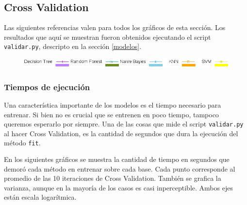 \documentclass[10pt, a4paper]{article}
\begin{document}
\subsection{Cross Validation}

Las siguientes referencias valen para todos los gráficos de esta sección. Los resultados que aquí se muestran fueron obtenidos ejecutando el script \texttt{validar.py}, descripto en la sección \ref{modelos}.

\begin{figure}[H]
\centering
\includegraphics[scale=0.6]{../src/data/refs.png}
\end{figure}

\subsubsection{Tiempos de ejecución}

Una característica importante de los modelos es el tiempo necesario para entrenar. Si bien no es crucial que se entrenen en poco tiempo, tampoco queremos esperarlo por siempre. Una de las cosas que mide el script \texttt{validar.py} al hacer Cross Validation, es la cantidad de segundos que dura la ejecución del método \texttt{fit}.

En los siguientes gráficos se muestra la cantidad de tiempo en segundos que demoró cada método en entrenar sobre cada base. Cada punto corresponde al promedio de las 10 iteraciones de Cross Validation. También se grafica la varianza, aunque en la mayoría de los casos es casi inperceptible. Ambos ejes están escala logarítmica.
\end{document}
